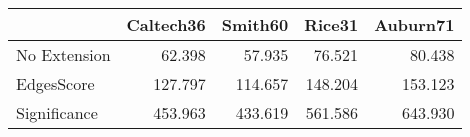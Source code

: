 \begin{tabular}{lrrrr}
\toprule
{} & Caltech36 & Smith60 &  Rice31 & Auburn71 \\
\midrule
No Extension &    62.398 &  57.935 &  76.521 &   80.438 \\
EdgesScore   &   127.797 & 114.657 & 148.204 &  153.123 \\
Significance &   453.963 & 433.619 & 561.586 &  643.930 \\
\bottomrule
\end{tabular}
